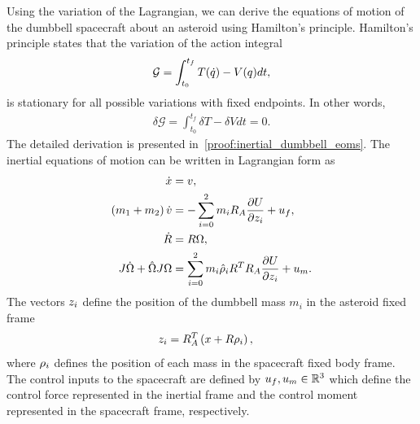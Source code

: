 Using the variation of the Lagrangian, we can derive the equations of motion of the dumbbell spacecraft about an asteroid using Hamilton's principle. 
Hamilton's principle states that the variation of the action integral
\begin{align}\label{eq:action_integral}
    \mathcal{G} = \int_{t_0}^{t_f} T(\dot{q}) - V(q) dt,
\end{align}
is stationary for all possible variations with fixed endpoints. 
In other words, 
\begin{align}\label{eq:hamiltons_principle}
    \delta \mathcal{G}  = \int_{t_0}^{t_f} \delta T - \delta V dt = 0.
\end{align}
The detailed derivation is presented in~\cref{proof:inertial_dumbbell_eoms}.
The inertial equations of motion can be written in Lagrangian form as
\begin{align}
    \dot{x} &= v, \label{eq:inertial_position_dynamics}\\
    \left( m_1 + m_2 \right) \dot{v} &= - \sum_{i=0}^2 m_i R_A \frac{\partial U}{\partial z_i} + u_f, \label{eq:inertial_velocity_dynamics}\\
    \dot{R} &= R \Omega, \label{eq:inertial_attitude_dynamics}\\
    J \dot{\Omega} + \hat{\Omega} J \Omega &= \sum_{i=0}^2 m_i \hat{\rho}_i R^T R_A \frac{\partial U}{\partial z_i} + u_m. \label{eq:inertial_angvel_dynamics}
\end{align}
The vectors \( z_i \) define the position of the dumbbell mass \( m_i \) in the asteroid fixed frame
\begin{align}\label{eq:mass_asteroid_frame}
    z_i &= R_A^T \left( x + R \rho_i \right),
\end{align}
where \( \rho_i \) defines the position of each mass in the spacecraft fixed body frame.
The control inputs to the spacecraft are defined by \( u_f, u_m \in \mathbb{R}^3 \) which define the control force represented in the inertial frame and the control moment represented in the spacecraft frame, respectively. 

